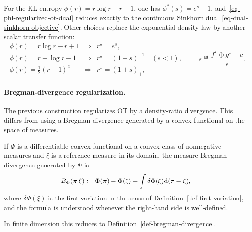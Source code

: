For the KL entropy $\phi(r)=r\log r-r+1$, one has $\phi^*(s)=e^s-1$, and~\eqref{eq-phi-regularized-ot-dual} reduces exactly to the continuous Sinkhorn dual~\eqref{eq-dual-sinkhorn-objective}. Other choices replace the exponential density law by another scalar transfer function:
\[
\begin{array}{lll}
	\phi(r)=r\log r-r+1 &\Rightarrow& r^\star=e^s,\\[.25em]
	\phi(r)=r-\log r-1 &\Rightarrow& r^\star=(1-s)^{-1}\quad (s<1),\\[.25em]
	\phi(r)=\frac12(r-1)^2 &\Rightarrow& r^\star=(1+s)_+,
\end{array}
\qquad
s\eqdef\frac{f^\star\oplus g^\star-c}{\epsilon}.
\]

\paragraph{Bregman-divergence regularization.}

The previous construction regularizes OT by a density-ratio divergence. This differs from using a Bregman divergence generated by a convex functional on the space of measures.

\begin{defn}\label{def-measure-bregman-divergence}
	If $\Phi$ is a differentiable convex functional on a convex class of nonnegative measures and $\xi$ is a reference measure in its domain, the measure Bregman divergence generated by $\Phi$ is
	\begin{equation}\label{eq-measure-bregman-divergence}
		B_\Phi(\pi|\xi)
		\coloneqq
		\Phi(\pi)-\Phi(\xi)
		-
		\int \delta\Phi(\xi)\mathrm{d}(\pi-\xi),
	\end{equation}
	where $\delta\Phi(\xi)$ is the first variation in the sense of Definition~\ref{def-first-variation}, and the formula is understood whenever the right-hand side is well-defined.
\end{defn}
In finite dimension this reduces to Definition~\ref{def-bregman-divergence}.

